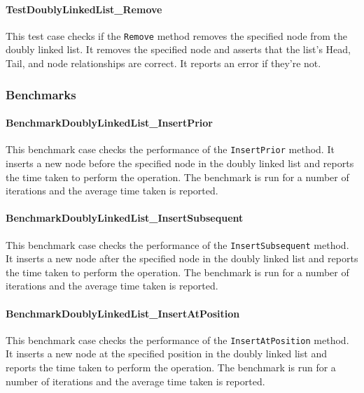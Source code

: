 \paragraph{TestDoublyLinkedList\_Remove}
This test case checks if the \lstinline{Remove} method removes the specified node from the doubly linked list. It removes the specified node and asserts that the list's Head, Tail, and node relationships are correct. It reports an error if they're not.

\subsubsection{Benchmarks}
\paragraph{BenchmarkDoublyLinkedList\_InsertPrior}
This benchmark case checks the performance of the \lstinline{InsertPrior} method. It inserts a new node before the specified node in the doubly linked list and reports the time taken to perform the operation. The benchmark is run for a number of iterations and the average time taken is reported.

\paragraph{BenchmarkDoublyLinkedList\_InsertSubsequent}
This benchmark case checks the performance of the \lstinline{InsertSubsequent} method. It inserts a new node after the specified node in the doubly linked list and reports the time taken to perform the operation. The benchmark is run for a number of iterations and the average time taken is reported.

\paragraph{BenchmarkDoublyLinkedList\_InsertAtPosition}
This benchmark case checks the performance of the \lstinline{InsertAtPosition} method. It inserts a new node at the specified position in the doubly linked list and reports the time taken to perform the operation. The benchmark is run for a number of iterations and the average time taken is reported.


